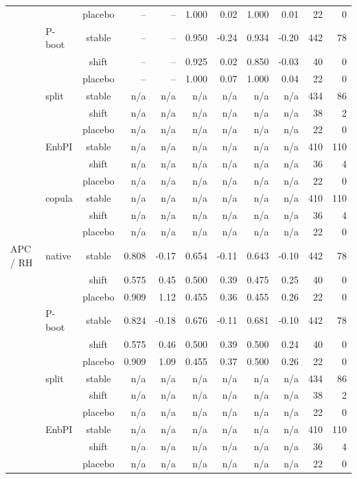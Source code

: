 {\begin{longtable}{@{}llcrrrrrrrr@{}}
 &  & placebo & -- & -- & 1.000 & 0.02 & 1.000 & 0.01 & 22 & 0 \\
 & P-boot & stable & -- & -- & 0.950 & -0.24 & 0.934 & -0.20 & 442 & 78 \\
 &  & shift & -- & -- & 0.925 & 0.02 & 0.850 & -0.03 & 40 & 0 \\
 &  & placebo & -- & -- & 1.000 & 0.07 & 1.000 & 0.04 & 22 & 0 \\
 & split & stable & n/a & n/a & n/a & n/a & n/a & n/a & 434 & 86 \\
 &  & shift & n/a & n/a & n/a & n/a & n/a & n/a & 38 & 2 \\
 &  & placebo & n/a & n/a & n/a & n/a & n/a & n/a & 22 & 0 \\
 & EnbPI & stable & n/a & n/a & n/a & n/a & n/a & n/a & 410 & 110 \\
 &  & shift & n/a & n/a & n/a & n/a & n/a & n/a & 36 & 4 \\
 &  & placebo & n/a & n/a & n/a & n/a & n/a & n/a & 22 & 0 \\
 & copula & stable & n/a & n/a & n/a & n/a & n/a & n/a & 410 & 110 \\
 &  & shift & n/a & n/a & n/a & n/a & n/a & n/a & 36 & 4 \\
 &  & placebo & n/a & n/a & n/a & n/a & n/a & n/a & 22 & 0 \\
\addlinespace[2pt]
APC / RH & native & stable & 0.808 & -0.17 & 0.654 & -0.11 & 0.643 & -0.10 & 442 & 78 \\
 &  & shift & 0.575 & 0.45 & 0.500 & 0.39 & 0.475 & 0.25 & 40 & 0 \\
 &  & placebo & 0.909 & 1.12 & 0.455 & 0.36 & 0.455 & 0.26 & 22 & 0 \\
 & P-boot & stable & 0.824 & -0.18 & 0.676 & -0.11 & 0.681 & -0.10 & 442 & 78 \\
 &  & shift & 0.575 & 0.46 & 0.500 & 0.39 & 0.500 & 0.24 & 40 & 0 \\
 &  & placebo & 0.909 & 1.09 & 0.455 & 0.37 & 0.500 & 0.26 & 22 & 0 \\
 & split & stable & n/a & n/a & n/a & n/a & n/a & n/a & 434 & 86 \\
 &  & shift & n/a & n/a & n/a & n/a & n/a & n/a & 38 & 2 \\
 &  & placebo & n/a & n/a & n/a & n/a & n/a & n/a & 22 & 0 \\
 & EnbPI & stable & n/a & n/a & n/a & n/a & n/a & n/a & 410 & 110 \\
 &  & shift & n/a & n/a & n/a & n/a & n/a & n/a & 36 & 4 \\
 &  & placebo & n/a & n/a & n/a & n/a & n/a & n/a & 22 & 0 \\

\end{longtable}}
